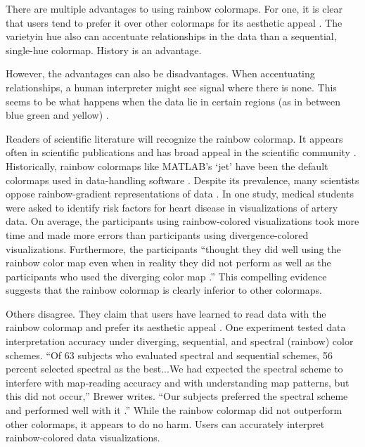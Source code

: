 \documentclass[journal]{IEEEtran}
\begin{document}
There are multiple advantages to using rainbow colormaps. For one, it is clear that users tend to prefer it
over other colormaps for its aesthetic appeal \cite{spectralschemes, choropleth, endofrainbow}. 
The varietyin hue also can accentuate relationships in the data than
a sequential, single-hue colormap. History is an advantage.
\par
However, the advantages can also be disadvantages.
When accentuating relationships, a human interpreter
might see signal where there is none. This seems to be
what happens when the data lie in certain regions (as in
between blue green and yellow) \cite{colorchoice}.
\par
Readers of scientific literature will recognize the rainbow colormap. 
It appears often in scientific publications and has 
broad appeal in the scientific community \cite{endofrainbow, rainbowstill, spectralschemes,mapchoropleth}.
 Historically, rainbow colormaps like
MATLAB’s ‘jet’ have been the default colormaps used
in data-handling software \cite{matlab}. Despite its prevalence, 
many scientists oppose rainbow-gradient representations of data \cite{rainbowstill, endofrainbow, viridis,arteryvis}.
 In one study, medical students were
asked to identify risk factors for heart disease in visualizations of artery data. On average, the participants
using rainbow-colored visualizations took more time
and made more errors than participants using divergence-colored visualizations. 
Furthermore, the participants “thought they did well using the rainbow color
map even when in reality they did not perform as well
as the participants who used the diverging color map
\cite{arteryvis}.” This compelling evidence suggests
that the rainbow colormap is clearly inferior to other
colormaps.
\par
Others disagree. They claim that users have learned to
read data with the rainbow colormap and prefer its aesthetic appeal \cite{spectralschemes, choropleth}. One
experiment tested data interpretation accuracy under
diverging, sequential, and spectral (rainbow) color
schemes. “Of 63 subjects who evaluated spectral and
sequential schemes, 56 percent selected spectral as the
best...We had expected the spectral scheme to interfere
with map-reading accuracy and with understanding
map patterns, but this did not occur,” Brewer writes.
“Our subjects preferred the spectral scheme and performed well with it \cite{spectralschemes}.”
 While the rainbow colormap did not outperform other colormaps, it
appears to do no harm. Users can accurately interpret
rainbow-colored data visualizations.
\par
\end{document}
